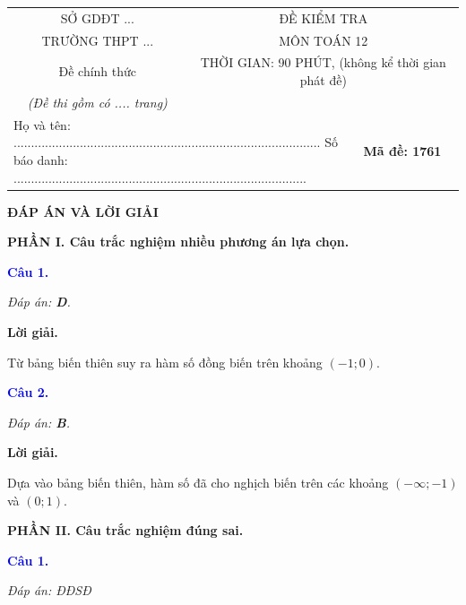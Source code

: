 \documentclass[12pt,a4paper]{article}
\begin{document}
\begin{center}
\begin{tabular}{|p{0.4\linewidth}|p{0.35\linewidth}|p{0.25\linewidth}|}
\hline
\multicolumn{1}{|c|}{SỞ GDĐT ...} & \multicolumn{2}{c|}{ĐỀ KIỂM TRA} \\
\multicolumn{1}{|c|}{TRƯỜNG THPT ...} & \multicolumn{2}{c|}{MÔN TOÁN 12} \\
\multicolumn{1}{|c|}{Đề chính thức} & \multicolumn{2}{c|}{THỜI GIAN: 90 PHÚT, (không kể thời gian phát đề)} \\
\multicolumn{1}{|c|}{\textit{(Đề thi gồm có .... trang)}} & \multicolumn{2}{c|}{} \\
\hline
\multicolumn{2}{|p{0.75\linewidth}|}{Họ và tên: ........................................................................................ \newline Số báo danh: ....................................................................................} & \multicolumn{1}{c|}{\textbf{Mã đề: 1761}} \\
\hline
\end{tabular}
\end{center}

\bigskip

\begin{center}
{\Large\textbf{ĐÁP ÁN VÀ LỜI GIẢI}}
\end{center}

\noindent\textbf{PHẦN I. Câu trắc nghiệm nhiều phương án lựa chọn.}

\medskip

\noindent\textcolor{blue}{\textbf{Câu 1.}}

\noindent \textit{Đáp án: \textbf{D}.}

\noindent\textbf{Lời giải.}

Từ bảng biến thiên suy ra hàm số đồng biến trên khoảng $(-1;0)$.

\medskip
\noindent\textcolor{blue}{\textbf{Câu 2.}}

\noindent \textit{Đáp án: \textbf{B}.}

\noindent\textbf{Lời giải.}

Dựa vào bảng biến thiên, hàm số đã cho nghịch biến trên các khoảng $(-\infty ;-1)$ và $(0 ; 1)$.

\medskip
\noindent\textbf{PHẦN II. Câu trắc nghiệm đúng sai.}

\medskip

\noindent\textcolor{blue}{\textbf{Câu 1.}}

\noindent \textit{Đáp án: ĐĐSĐ}
\end{document}
